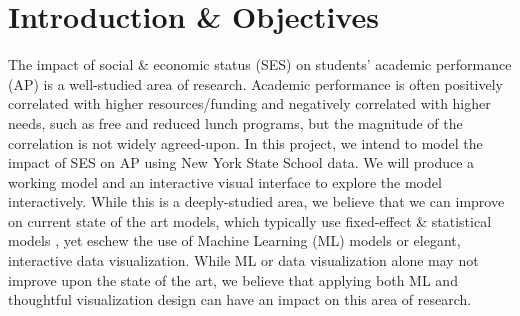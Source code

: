\documentclass[sigconf,nonacm,11pt]{acmart}
\begin{document}
\section{Introduction \& Objectives}

The impact of  social \& economic status (SES) on students' academic performance (AP) is a well-studied area of research.  Academic performance is often positively correlated with higher resources/funding \cite{jinnai}and negatively correlated with higher needs, such as free and reduced lunch programs\cite{sirin}, but the magnitude of the correlation is not widely agreed-upon. In this project, we intend to model the impact of SES on AP using New York State School data. We will produce a working model and an interactive visual interface to explore the model interactively. While this is a deeply-studied area, we believe that we can improve on current state of the art models, which typically use fixed-effect \& statistical models \cite{hearn, farooq}, yet eschew the use of Machine Learning (ML) models or elegant, interactive data visualization. While ML or data visualization alone may not improve upon the state of the art, we believe that applying both ML and thoughtful visualization design can have an impact on this area of research.


\end{document}
